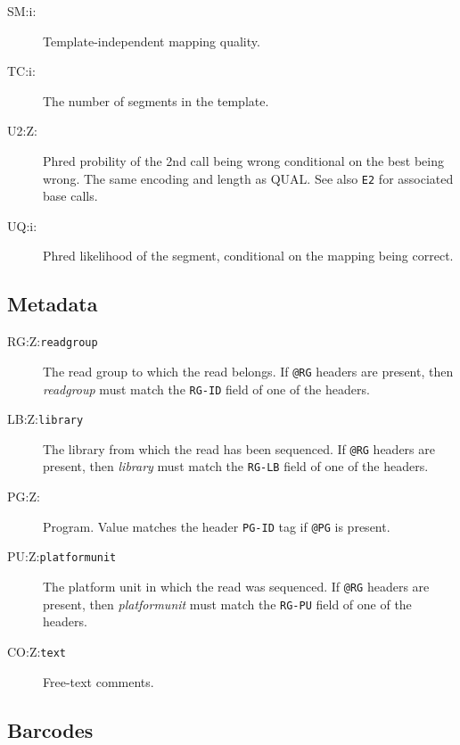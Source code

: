 \documentclass[10pt]{article}
\newcommand{\tagvalue}[1]{\tt #1}
\begin{document}
\begin{description}
\item[SM:i:\tagvalue{}]
Template-independent mapping quality.

\item[TC:i:\tagvalue{}]
The number of segments in the template.

\item[U2:Z:\tagvalue{}]
Phred probility of the 2nd call being wrong conditional on the best being wrong.
The same encoding and length as {\sf QUAL}.  See also {\tt E2} for associated base calls.

\item[UQ:i:\tagvalue{}]
Phred likelihood of the segment, conditional on the mapping being correct.
\end{description}

\subsection{Metadata}

\begin{description}
\item[RG:Z:\tagvalue{readgroup}]
The read group to which the read belongs.
If {\tt @RG} headers are present, then \emph{readgroup} must match the
{\tt RG-ID} field of one of the headers.

\item[LB:Z:\tagvalue{library}]
The library from which the read has been sequenced.
If {\tt @RG} headers are present, then \emph{library} must match the
{\tt RG-LB} field of one of the headers.

\item[PG:Z:\tagvalue{}]
Program. Value matches the header {\tt PG-ID} tag if {\tt @PG} is present.

\item[PU:Z:\tagvalue{platformunit}]
The platform unit in which the read was sequenced.
If {\tt @RG} headers are present, then \emph{platformunit} must match the
{\tt RG-PU} field of one of the headers.

\item[CO:Z:\tagvalue{text}]
Free-text comments.
\end{description}

\subsection{Barcodes}
\end{document}
